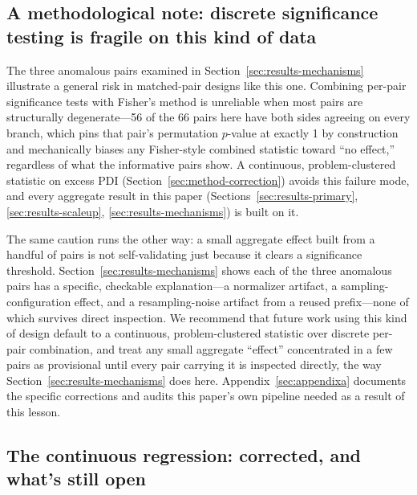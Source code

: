 \documentclass{article}
\begin{document}
\subsection{A methodological note: discrete significance testing is fragile on this kind of data}
\label{sec:lim-caution}

The three anomalous pairs examined in Section~\ref{sec:results-mechanisms} illustrate a general risk in matched-pair designs like this one. Combining per-pair significance tests with Fisher's method is unreliable when most pairs are structurally degenerate---56 of the 66 pairs here have both sides agreeing on every branch, which pins that pair's permutation $p$-value at exactly 1 by construction and mechanically biases any Fisher-style combined statistic toward ``no effect,'' regardless of what the informative pairs show. A continuous, problem-clustered statistic on excess PDI (Section~\ref{sec:method-correction}) avoids this failure mode, and every aggregate result in this paper (Sections~\ref{sec:results-primary}, \ref{sec:results-scaleup}, \ref{sec:results-mechanisms}) is built on it.

The same caution runs the other way: a small aggregate effect built from a handful of pairs is not self-validating just because it clears a significance threshold. Section~\ref{sec:results-mechanisms} shows each of the three anomalous pairs has a specific, checkable explanation---a normalizer artifact, a sampling-configuration effect, and a resampling-noise artifact from a reused prefix---none of which survives direct inspection. We recommend that future work using this kind of design default to a continuous, problem-clustered statistic over discrete per-pair combination, and treat any small aggregate ``effect'' concentrated in a few pairs as provisional until every pair carrying it is inspected directly, the way Section~\ref{sec:results-mechanisms} does here. Appendix~\ref{sec:appendixa} documents the specific corrections and audits this paper's own pipeline needed as a result of this lesson.

\subsection{The continuous regression: corrected, and what's still open}
\label{sec:lim-continuous}
\end{document}
